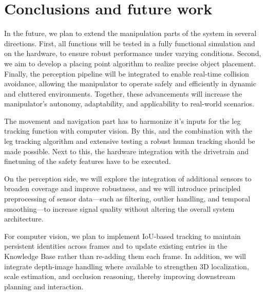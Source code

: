 \section{Conclusions and future work}
In the future, we plan to extend the manipulation parts of the system in several directions. First, all functions will be tested in a fully functional simulation and on the hardware, to ensure robust performance under varying conditions. Second, we aim to develop a placing point algorithm to realize precise object placement. Finally, the perception pipeline will be integrated to enable real-time collision avoidance, allowing the manipulator to operate safely and efficiently in dynamic and cluttered environments. Together, these advancements will increase the manipulator's autonomy, adaptability, and applicability to real-world scenarios.

The movement and navigation part has to harmonize it's inputs for the leg tracking function with computer vision. By this, and the combination with the leg tracking algorithm and extensive testing a robust human tracking should be made possible. Next to this, the hardware integration with the drivetrain and finetuning of the safety features have to be executed.

On the perception side, we will explore the integration of additional sensors to broaden coverage and improve robustness, and we will introduce principled preprocessing of sensor data—such as filtering, outlier handling, and temporal smoothing—to increase signal quality without altering the overall system architecture.

For computer vision, we plan to implement IoU-based tracking to maintain persistent identities across frames and to update existing entries in the Knowledge Base rather than re-adding them each frame. In addition, we will integrate depth-image handling where available to strengthen 3D localization, scale estimation, and occlusion reasoning, thereby improving downstream planning and interaction.
